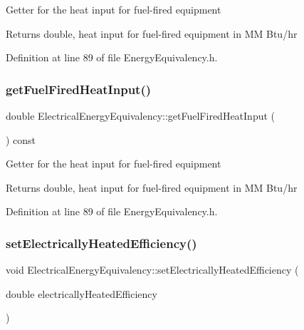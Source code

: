 Getter for the heat input for fuel-\/fired equipment

\begin{DoxyReturn}{Returns}
double, heat input for fuel-\/fired equipment in MM Btu/hr 
\end{DoxyReturn}


Definition at line 89 of file Energy\+Equivalency.\+h.

\mbox{\label{class_electrical_energy_equivalency_acb07f4cd7d416922bc355b2f1b3aadb4}} 
\subsubsection{\texorpdfstring{get\+Fuel\+Fired\+Heat\+Input()}{getFuelFiredHeatInput()}\hspace{0.1cm}{\footnotesize\ttfamily [3/3]}}
{\footnotesize\ttfamily double Electrical\+Energy\+Equivalency\+::get\+Fuel\+Fired\+Heat\+Input (\begin{DoxyParamCaption}{ }\end{DoxyParamCaption}) const\hspace{0.3cm}{\ttfamily [inline]}}

Getter for the heat input for fuel-\/fired equipment

\begin{DoxyReturn}{Returns}
double, heat input for fuel-\/fired equipment in MM Btu/hr 
\end{DoxyReturn}


Definition at line 89 of file Energy\+Equivalency.\+h.

\mbox{\label{class_electrical_energy_equivalency_ab9091e720096a4c088cece14e975ccb4}} 
\subsubsection{\texorpdfstring{set\+Electrically\+Heated\+Efficiency()}{setElectricallyHeatedEfficiency()}\hspace{0.1cm}{\footnotesize\ttfamily [1/3]}}
{\footnotesize\ttfamily void Electrical\+Energy\+Equivalency\+::set\+Electrically\+Heated\+Efficiency (\begin{DoxyParamCaption}\item[{double}]{electrically\+Heated\+Efficiency }\end{DoxyParamCaption})\hspace{0.3cm}{\ttfamily [inline]}}

